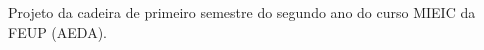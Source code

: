 Projeto da cadeira de primeiro semestre do segundo ano do curso M\+I\+E\+IC da F\+E\+UP (A\+E\+DA). 
